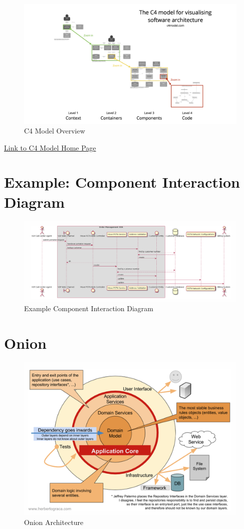 \documentclass[../Main.tex]{subfiles}
\begin{document}
\begin{figure}[H]
    \centering
    \includegraphics[]{Images/c4-overview.png}
    \caption{C4 Model Overview}
    \label{fig:c4modeloverview}
\end{figure}
\href{https://c4model.com/}{Link to C4 Model Home Page}
\section{Example: Component Interaction Diagram}
\begin{figure}[H]
    \centering
    \includegraphics{Images/cid.png}
    \caption{Example Component Interaction Diagram}
    \label{fig:examplecid}
\end{figure}
\newpage
\section{Onion}
\begin{figure}[H]
    \centering
    \includegraphics{Images/onion.png}
    \caption{Onion Architecture}
\end{figure}
\newpage
\end{document}
